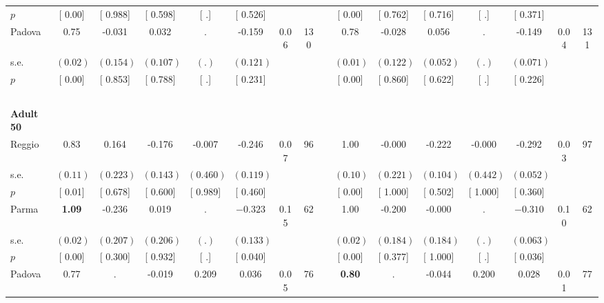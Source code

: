 \begin{longtable}{L{8em} c c c c c c c p{1em} c c c c c c c}
\quad \quad \quad \quad $ p$ & [     0.00] & [    0.988] & [    0.598] & [        .] & [    0.526] & & & & [     0.00] & [    0.762] & [    0.716] & [        .] & [    0.371] & &  \\[1em]
\quad \quad \quad Padova& 0.75 &    -0.031 &     0.032 &         . &    -0.159 &      0.06 &       130 & & 0.78 &    -0.028 &     0.056 &         . &    -0.149 &      0.04 &       131  \\*
\quad \quad \quad \quad s.e.& $ (     0.02)$ & $ (    0.154)$ & $ (    0.107)$ & $ (        .)$ & $ (    0.121)$ & & & & $ (     0.01)$ & $ (    0.122)$ & $ (    0.052)$ & $ (        .)$ & $ (    0.071)$ & &  \\*
\quad \quad \quad \quad $ p$ & [     0.00] & [    0.853] & [    0.788] & [        .] & [    0.231] & & & & [     0.00] & [    0.860] & [    0.622] & [        .] & [    0.226] & &  \\[1em]
~\\[1em]
\quad \quad \textbf{Adult 50} & & & & & & & & & & & & & & & \\* 
\quad \quad \quad Reggio& 0.83 &     0.164 &    -0.176 &    -0.007 &    -0.246 &      0.07 &        96 & & 1.00 &    -0.000 &    -0.222 &    -0.000 &    -0.292 &      0.03 &        97  \\*
\quad \quad \quad \quad s.e.& $ (     0.11)$ & $ (    0.223)$ & $ (    0.143)$ & $ (    0.460)$ & $ (    0.119)$ & & & & $ (     0.10)$ & $ (    0.221)$ & $ (    0.104)$ & $ (    0.442)$ & $ (    0.052)$ & &  \\*
\quad \quad \quad \quad $ p$ & [     0.01] & [    0.678] & [    0.600] & [    0.989] & [    0.460] & & & & [     0.00] & [    1.000] & [    0.502] & [    1.000] & [    0.360] & &  \\[1em]
\quad \quad \quad Parma& \textbf{     1.09} &    -0.236 &     0.019 &         . & $ \mathbf{   -0.323}$ &      0.15 &        62 & & 1.00 &    -0.200 &    -0.000 &         . & $ \mathbf{   -0.310}$ &      0.10 &        62  \\*
\quad \quad \quad \quad s.e.& $ (     0.02)$ & $ (    0.207)$ & $ (    0.206)$ & $ (        .)$ & $ (    0.133)$ & & & & $ (     0.02)$ & $ (    0.184)$ & $ (    0.184)$ & $ (        .)$ & $ (    0.063)$ & &  \\*
\quad \quad \quad \quad $ p$ & [     0.00] & [    0.300] & [    0.932] & [        .] & [    0.040] & & & & [     0.00] & [    0.377] & [    1.000] & [        .] & [    0.036] & &  \\[1em]
\quad \quad \quad Padova& 0.77 &         . &    -0.019 &     0.209 &     0.036 &      0.05 &        76 & & \textbf{     0.80} &         . &    -0.044 &     0.200 &     0.028 &      0.01 &        77  \\*

\end{longtable}
